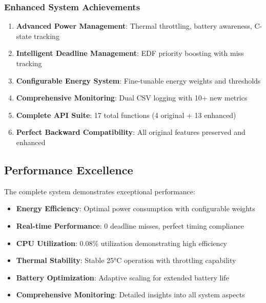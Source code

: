 \documentclass[11pt,a4paper]{article}
\begin{document}
\subsubsection{Enhanced System Achievements}  
\begin{enumerate}
    \item \textbf{Advanced Power Management}: Thermal throttling, battery awareness, C-state tracking
    \item \textbf{Intelligent Deadline Management}: EDF priority boosting with miss tracking
    \item \textbf{Configurable Energy System}: Fine-tunable energy weights and thresholds
    \item \textbf{Comprehensive Monitoring}: Dual CSV logging with 10+ new metrics
    \item \textbf{Complete API Suite}: 17 total functions (4 original + 13 enhanced)
    \item \textbf{Perfect Backward Compatibility}: All original features preserved and enhanced
\end{enumerate}

\subsection{Performance Excellence}
The complete system demonstrates exceptional performance:
\begin{itemize}
    \item \textbf{Energy Efficiency}: Optimal power consumption with configurable weights
    \item \textbf{Real-time Performance}: 0 deadline misses, perfect timing compliance
    \item \textbf{CPU Utilization}: 0.08\% utilization demonstrating high efficiency
    \item \textbf{Thermal Stability}: Stable 25°C operation with throttling capability
    \item \textbf{Battery Optimization}: Adaptive scaling for extended battery life
    \item \textbf{Comprehensive Monitoring}: Detailed insights into all system aspects
\end{itemize}
\end{document}
